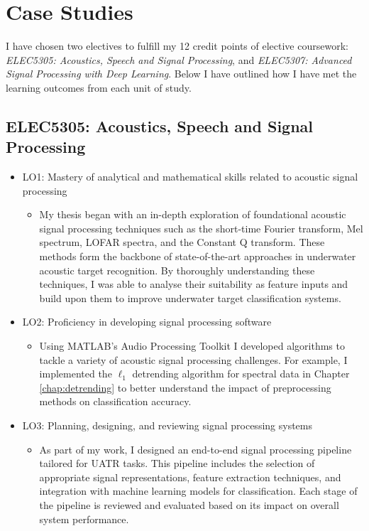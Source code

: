 \chapter{Case Studies}

I have chosen two electives to fulfill my 12 credit points of elective coursework: \textit{ELEC5305: Acoustics, Speech and Signal Processing}, and \textit{ELEC5307: Advanced Signal Processing with Deep Learning}. Below I have outlined how I have met the learning outcomes from each unit of study.

\section{ELEC5305: Acoustics, Speech and Signal Processing}

\begin{itemize}
    \item LO1: Mastery of analytical and mathematical skills related to acoustic signal processing
    \begin{itemize}
        \item My thesis began with an in-depth exploration of foundational acoustic signal processing techniques such as the short-time Fourier transform, Mel spectrum, LOFAR spectra, and the Constant Q transform. These methods form the backbone of state-of-the-art approaches in underwater acoustic target recognition. By thoroughly understanding these techniques, I was able to analyse their suitability as feature inputs and build upon them to improve underwater target classification systems.
    \end{itemize}
    \item LO2: Proficiency in developing signal processing software
    \begin{itemize}
        \item Using MATLAB's Audio Processing Toolkit I developed algorithms to tackle a variety of acoustic signal processing challenges. For example, I implemented the $\ell_1$ detrending algorithm for spectral data in Chapter \ref{chap:detrending} to better understand the impact of preprocessing methods on classification accuracy.
    \end{itemize}
    \item LO3: Planning, designing, and reviewing signal processing systems
    \begin{itemize}
        \item As part of my work, I designed an end-to-end signal processing pipeline tailored for UATR tasks. This pipeline includes the selection of appropriate signal representations, feature extraction techniques, and integration with machine learning models for classification. Each stage of the pipeline is reviewed and evaluated based on its impact on overall system performance.

\end{itemize}
\end{itemize}
